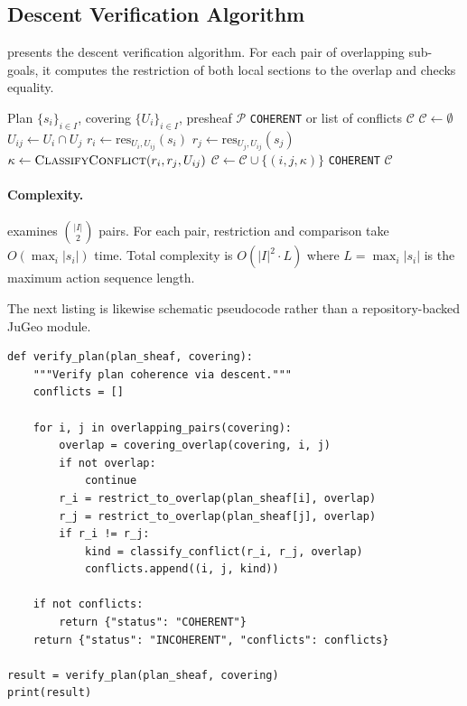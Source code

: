 \documentclass[11pt]{article}
\newcommand{\PlanSheaf}{\mathcal{P}}
\newcommand{\SubGoal}[1]{U_{#1}}
\newcommand{\PlanVerify}{\textsc{PlanVerify}}
\newcommand{\CoverFam}{\{U_i\}_{i \in I}}
\newcommand{\ConflictSet}{\mathcal{C}}
\newcommand{\PlanRes}{\mathrm{res}}
\begin{document}
\subsection{Descent Verification Algorithm}\label{ssec:descent-alg}

 presents the descent verification
algorithm.  For each pair of overlapping sub-goals, it computes
the restriction of both local sections to the overlap and checks
equality.

\begin{algorithm}[ht]
\caption{$\PlanVerify$: Descent Verification for Agent Plans}
\label{alg:descent-verify}
\begin{algorithmic}[1]
\REQUIRE Plan $\{s_i\}_{i \in I}$, covering $\CoverFam$, presheaf $\PlanSheaf$
\ENSURE \texttt{COHERENT} or list of conflicts $\ConflictSet$
\STATE $\ConflictSet \leftarrow \emptyset$
  \STATE $\SubGoal{ij} \leftarrow \SubGoal{i} \cap \SubGoal{j}$
  \IF{$\SubGoal{ij} \neq \emptyset$}
    \STATE $r_i \leftarrow \PlanRes_{\SubGoal{i}, \SubGoal{ij}}(s_i)$
    \STATE $r_j \leftarrow \PlanRes_{\SubGoal{j}, \SubGoal{ij}}(s_j)$
      \STATE $\kappa \leftarrow \textsc{ClassifyConflict}(r_i, r_j, \SubGoal{ij})$
      \STATE $\ConflictSet \leftarrow \ConflictSet \cup \{(i, j, \kappa)\}$
    \ENDIF
  \ENDIF
\ENDFOR
\IF{$\ConflictSet = \emptyset$}
  \RETURN \texttt{COHERENT}
\ELSE
  \RETURN $\ConflictSet$
\ENDIF
\end{algorithmic}
\end{algorithm}

\paragraph{Complexity.}
 examines $\binom{|I|}{2}$ pairs.
For each pair, restriction and comparison take
$O(\max_i |s_i|)$ time.  Total complexity is
$O(|I|^2 \cdot L)$ where $L = \max_i |s_i|$ is the maximum
action sequence length.

The next listing is likewise schematic pseudocode rather than a
repository-backed JuGeo module.

\begin{lstlisting}
def verify_plan(plan_sheaf, covering):
    """Verify plan coherence via descent."""
    conflicts = []

    for i, j in overlapping_pairs(covering):
        overlap = covering_overlap(covering, i, j)
        if not overlap:
            continue
        r_i = restrict_to_overlap(plan_sheaf[i], overlap)
        r_j = restrict_to_overlap(plan_sheaf[j], overlap)
        if r_i != r_j:
            kind = classify_conflict(r_i, r_j, overlap)
            conflicts.append((i, j, kind))

    if not conflicts:
        return {"status": "COHERENT"}
    return {"status": "INCOHERENT", "conflicts": conflicts}

result = verify_plan(plan_sheaf, covering)
print(result)
\end{lstlisting}
\end{document}
